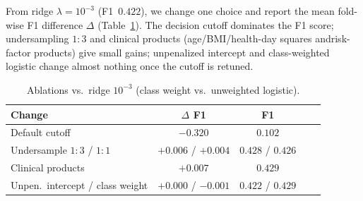 

From ridge $\lambda{=}10^{-3}$ (F1~$0.422$), we change one choice and report
the mean fold-wise F1 difference $\Delta$ (Table~\ref{tab:ablations}).
The decision cutoff dominates the F1 score; undersampling $1{:}3$ and clinical products (age/BMI/health-day squares andrisk-factor products) give small gains; unpenalized intercept and
class-weighted logistic change almost nothing once the cutoff is retuned.

\begin{table}[h!]
  \centering
  \caption{Ablations vs.\ ridge $10^{-3}$ (class weight vs.\ unweighted logistic).}
  \label{tab:ablations}
  \setlength{\tabcolsep}{3pt}
  \begin{tabular}{lcccc}
    \toprule
    Change & $\Delta$ F1 & F1 \\
    \midrule
    Default cutoff & $-0.320$ & $0.102$ \\
    Undersample $1{:}3$ / $1{:}1$ & $+0.006$ / $+0.004$ & $0.428$ / $0.426$ \\
    Clinical products & $+0.007$ & $0.429$ \\
    Unpen.\ intercept / class weight & $+0.000$ / $-0.001$ & $0.422$ / $0.429$ \\
    \bottomrule
  \end{tabular}
\end{table}
